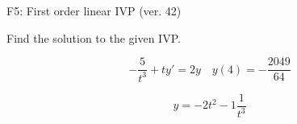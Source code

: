 \begin{exercise}
  \begin{exerciseTitle}F5: First order linear IVP (ver. 42)\end{exerciseTitle}
  \begin{exerciseStatement}
    
Find the solution to the given IVP.

    
\[-\frac{5}{t^{3}} +ty'= 2 y \hspace{1em} y( 4 ) = -\frac{2049}{64}\]

  \end{exerciseStatement}
  \begin{exerciseAnswer}
    
\[y= -2 t^ 2 -1 \frac{1}{t^{3}}\]

  \end{exerciseAnswer}
\end{exercise}